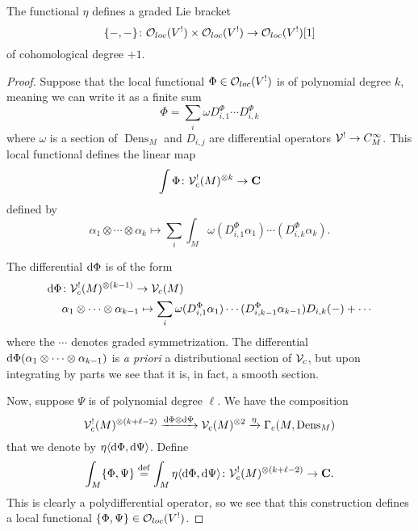 \documentclass[11pt]{amsart}
\renewcommand{\op}{\operatorname}
\begin{document}
\begin{lem}
The functional $\eta$ defines a
graded Lie bracket
\begin{equation}
\{-,-\} \colon {\mathcal O}_{loc}(V^!) \times {\mathcal O}_{loc}(V^!) \to {\mathcal O}_{loc}(V^!)[1]
\end{equation}
of cohomological degree $+1$.
\end{lem}
\begin{proof}
Suppose that the local functional $\Phi \in {\mathcal O}_{loc}(V^!)$ is of polynomial degree $k$, meaning we can write it as a finite sum
\begin{equation}
\Phi = \sum_i \omega D^\Phi_{i,1} \cdots D^\Phi_{i,k}
\end{equation}
where $\omega$ is a section of $\op{Dens}_M$ and $D_{i,j}$ are differential operators $\mathcal V^! \to C^\infty_M$.
This local functional defines the linear map
\begin{equation}
\int \Phi \colon \mathcal V_c^!(M)^{\otimes k} \to \mathbf{C}
\end{equation}
defined by
\begin{equation}
\alpha_1 \otimes \cdots \otimes \alpha_k \mapsto \sum_i \int_M \omega  (D_{i,1}^\Phi \alpha_1) \cdots (D_{i,k}^\Phi \alpha_k) .
\end{equation}

The differential ${\rm d} \Phi$ is of the form
\begin{align*}
{\rm d} \Phi & \colon \mathcal V^!_c(M)^{\otimes (k-1)} \to \mathcal V_c(M)  \\ & \alpha_1 \otimes \cdots \otimes \alpha_{k-1} \mapsto \sum_i \omega (D_{i,1}^\Phi \alpha_1) \cdots (D_{i,k-1}^\Phi \alpha_{k-1}) D_{i,k}(-) + \cdots 
\end{align*}
where the $\cdots$ denotes graded symmetrization.
The differential ${\rm d} \Phi (\alpha_1 \otimes \cdots \otimes \alpha_{k-1})$ is \textit{a priori} a distributional section of $\mathcal V_c$, but upon integrating by parts we see that it is, in fact, a smooth section.

Now, suppose $\Psi$ is of polynomial degree $\ell$.
We have the composition
\begin{equation}
\cV_{c}^!(M)^{\otimes (k+\ell-2)} \xto{\d \Phi \otimes \d \Psi} \cV_c(M)^{\otimes 2} \xto{\eta} \Gamma_c(M,\op{Dens}_M)
\end{equation}
that we denote by $\eta\langle{\rm d} \Phi, {\rm d} \Psi\rangle$.
Define
\begin{equation}
\int_M \{\Phi, \Psi\} \overset{\rm def}{=} \int_M \eta\langle{\rm d} \Phi, {\rm d} \Psi\rangle \colon \mathcal V_c^!(M)^{\otimes (k+\ell-2)} \to \mathbf{C} .
\end{equation}
This is clearly a polydifferential operator, so we see that this construction defines a local functional $\{\Phi,\Psi\} \in {\mathcal O}_{loc}(V^!)$.
\end{proof}
\end{document}
